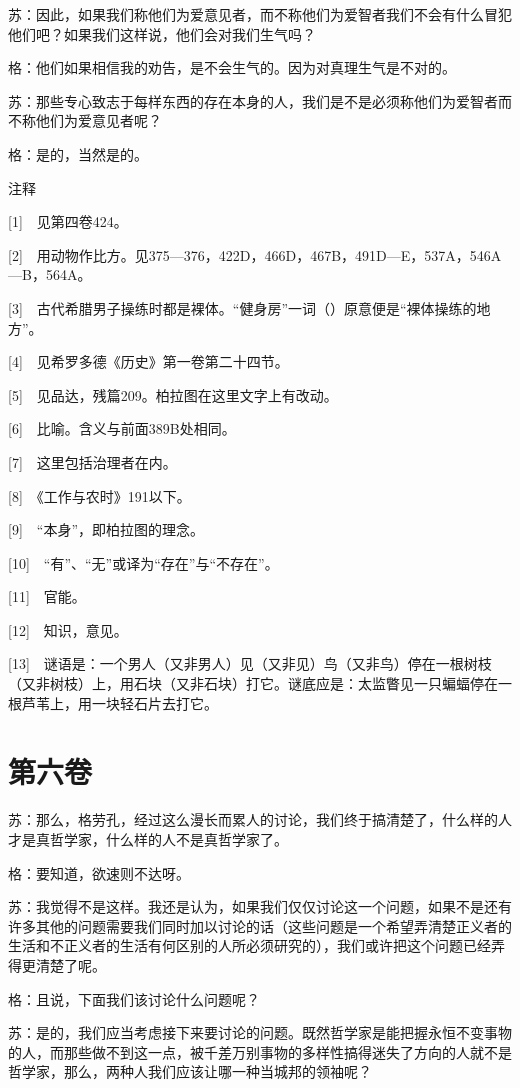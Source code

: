 \documentclass[12pt,oneside]{book}
\begin{document}
苏：因此，如果我们称他们为爱意见者，而不称他们为爱智者我们不会有什么冒犯他们吧？如果我们这样说，他们会对我们生气吗？

格：他们如果相信我的劝告，是不会生气的。因为对真理生气是不对的。

苏：那些专心致志于每样东西的存在本身的人，我们是不是必须称他们为爱智者而不称他们为爱意见者呢？

格：是的，当然是的。

注释

[1]　见第四卷424。

[2]　用动物作比方。见375—376，422D，466D，467B，491D—E，537A，546A—B，564A。

[3]　古代希腊男子操练时都是裸体。“健身房”一词（）原意便是“裸体操练的地方”。

[4]　见希罗多德《历史》第一卷第二十四节。

[5]　见品达，残篇209。柏拉图在这里文字上有改动。

[6]　比喻。含义与前面389B处相同。

[7]　这里包括治理者在内。

[8]　《工作与农时》191以下。

[9]　“本身”，即柏拉图的理念。

[10]　“有”、“无”或译为“存在”与“不存在”。

[11]　官能。

[12]　知识，意见。

[13]　谜语是：一个男人（又非男人）见（又非见）鸟（又非鸟）停在一根树枝（又非树枝）上，用石块（又非石块）打它。谜底应是：太监瞥见一只蝙蝠停在一根芦苇上，用一块轻石片去打它。





\chapter{第六卷}

苏：那么，格劳孔，经过这么漫长而累人的讨论，我们终于搞清楚了，什么样的人才是真哲学家，什么样的人不是真哲学家了。

格：要知道，欲速则不达呀。

苏：我觉得不是这样。我还是认为，如果我们仅仅讨论这一个问题，如果不是还有许多其他的问题需要我们同时加以讨论的话（这些问题是一个希望弄清楚正义者的生活和不正义者的生活有何区别的人所必须研究的），我们或许把这个问题已经弄得更清楚了呢。

格：且说，下面我们该讨论什么问题呢？

苏：是的，我们应当考虑接下来要讨论的问题。既然哲学家是能把握永恒不变事物的人，而那些做不到这一点，被千差万别事物的多样性搞得迷失了方向的人就不是哲学家，那么，两种人我们应该让哪一种当城邦的领袖呢？
\end{document}
